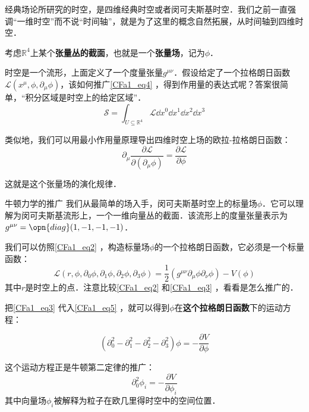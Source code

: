 经典场论所研究的时空，是四维经典时空或者闵可夫斯基时空．我们之前一直强调“一维时空”而不说“时间轴”，就是为了这里的概念自然拓展，从时间轴到四维时空．



考虑$\mathbb{R}^4$上某个\textbf{张量丛的截面}，也就是一个\textbf{张量场}，记为$\phi$．

时空是一个流形，上面定义了一个度量张量$g^{\mu\nu}$．假设给定了一个拉格朗日函数$\mathcal{L}(x^\mu, \phi, \partial_\mu\phi)$，该如何推广\autoref{CFa1_eq4} ，得到作用量的表达式呢？答案很简单，“积分区域是时空上的给定区域”．
\begin{equation}
\mathcal{S} = \int_{U\subseteq \mathbb{R}^4} \mathcal{L}\dd x^0\dd x^1\dd x^2\dd x^3
\end{equation}

类似地，我们可以用最小作用量原理导出四维时空上场的欧拉-拉格朗日函数：
\begin{equation}\label{CFa1_eq5}
\partial_\mu \frac{\partial\mathcal{L}}{\partial(\partial_\mu \phi)} = \frac{\partial\mathcal{L}}{\partial \phi}
\end{equation}

这就是这个张量场的演化规律．

\begin{example}{牛顿力学的推广}\label{CFa1_ex1}
我们从最简单的场入手，闵可夫斯基时空上的标量场$\phi$．它可以理解为闵可夫斯基流形上，一个一维向量丛的截面．该流形上的度量张量表示为$g^{\mu\nu}=\opn{diag}(1, -1, -1, -1)$．

我们可以仿照\autoref{CFa1_eq2} ，构造标量场$\phi$的一个拉格朗日函数，它必须是一个标量函数：
\begin{equation}\label{CFa1_eq3}
\mathcal{L}(r, \phi, \partial_0\phi, \partial_1\phi, \partial_2\phi, \partial_3\phi) = \frac{1}{2}(g^{\mu\nu}\partial_\mu\phi \partial_\nu\phi) - V(\phi)
\end{equation}
其中$r$是时空上的点．注意比较\autoref{CFa1_eq2} 和\autoref{CFa1_eq3} ，看看是怎么推广的．

把\autoref{CFa1_eq3} 代入\autoref{CFa1_eq5} ，就可以得到$\phi$在\textbf{这个拉格朗日函数}下的运动方程：

\begin{equation}
(\partial^2_0-\partial^2_1-\partial^2_2-\partial^2_3)\phi = -\frac{\partial V}{\partial \phi}
\end{equation}

这个运动方程正是牛顿第二定律的推广：
\begin{equation}
\partial^2_0 \phi_i = -\frac{\partial V}{\partial \phi_i}
\end{equation}
其中向量场$\phi_i$被解释为粒子在欧几里得时空中的空间位置．

\end{example}



